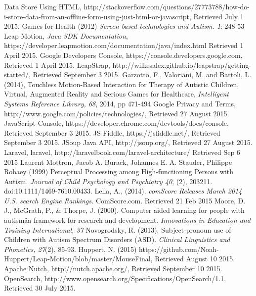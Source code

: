 \documentclass[a4paper, 11pt]{article}
\begin{document}
\begin{thebibliography}{100}
 Data Store Using HTML, http://stackoverflow.com/questions/27773788/how-do-i-store-data-from-an-offline-form-using-just-html-or-javascript, Retrieved July 1 2015.
 Games for Health (2012) \textit{Screen-based technologies and Autism. 1}: 248-53
 Leap Motion, \textit{Java SDK Documentation}, \\https://developer.leapmotion.com/documentation/java/index.html Retrieved 1 April 2015.
 Google Developers Console, https://console.developers.google.com, Retrieved 1 April 2015.
 LeapStrap, http://wilkesalex.github.io/leapstrap/getting-started/, Retrieved September 3 2015.
 Garzotto, F., Valoriani, M. and Bartoli, L. (2014), Touchless Motion-Based Interaction for Therapy of Autistic Children, Virtual, Augmented Reality and Serious Games for Healthcare, \textit{Intelligent Systems Reference Library, 68}, 2014, pp 471-494
 Google Privacy and Terms, http://www.google.com/policies/technologies/, Retrieved 27 August 2015.
 JavaScript Console, https://developer.chrome.com/devtools/docs/console, Retrieved September 3 2015.
 JS Fiddle, https://jsfiddle.net/, Retrieved September 3 2015.
 JSoup Java API, http://jsoup.org/, Retrieved 27 August 2015.
Laravel, laravel, http://laravelbook.com/laravel-architecture/ Retrieved Sep 6 2015
Laurent Mottron, Jacob A. Burack, Johannes E. A. Stauder, Philippe Robaey (1999) Perceptual Processing among High-functioning Persons with Autism. \textit{Journal of Child Psychology and Psychiatry 40}, (2), 203211. doi:10.1111/1469-7610.00433.
Lella, A., (2014). \textit{comScore Releases March 2014 U.S. search Engine Rankings.} ComScore.com. Retrieved 21 Feb 2015
Moore, D. J., McGrath, P., \& Thorpe, J. (2000). Computer aided learning for people with autismâa framework for research and development. \textit{Innovations in Education and Training International, 37}
 Novogrodsky, R. (2013). Subject-pronoun use of Children with Autism Spectrum Disorders (ASD). \textit{Clinical Linguistics and Phonetics, 27}(2), 85-93. 
 Huppert, N. (2015) https://github.com/Noah-Huppert/Leap-Motion/blob/master/MouseFinal, Retrieved August 10 2015.
 Apache Nutch, http://nutch.apache.org/, Retrieved September 10 2015.
OpenSearch, http://www.opensearch.org/Specifications/OpenSearch/1.1, Retrieved 30 July 2015.

\end{thebibliography}
\end{document}
